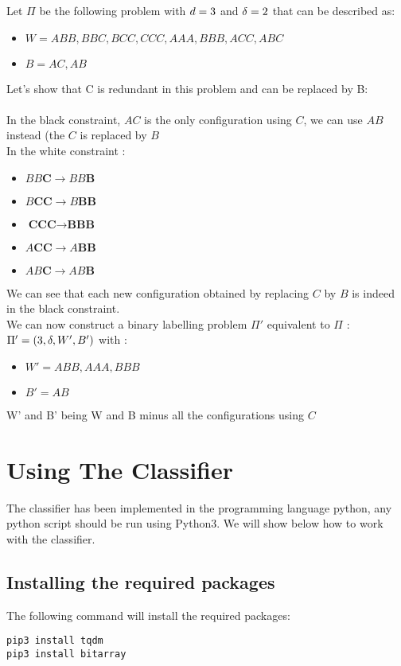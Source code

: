 \begin{exmp}
Let $\Pi$ be the following problem with $d = 3$ and $\delta = 2$ that can be described as:
\begin{itemize}
    \item $W = ABB, BBC, BCC, CCC, AAA, BBB, ACC, ABC$
    \item $B = AC, AB$
\end{itemize}
Let's show that C is redundant in this problem and can be replaced by B:\\\\
In the black constraint, $AC$ is the only configuration using $C$, we can use $AB$ instead (the $C$ is replaced by $B$\\
In the white constraint :
\begin{itemize}
    \item $BB\textbf{C} \rightarrow BB\textbf{B}$
    \item $B\textbf{CC} \rightarrow B\textbf{BB}$
    \item $\textbf{CCC} \rightarrow \textbf{BBB}$
    \item $A\textbf{CC} \rightarrow A\textbf{BB}$
    \item $AB\textbf{C} \rightarrow AB\textbf{B}$
\end{itemize}
We can see that each new configuration obtained by replacing $C$ by $B$ is indeed in the black constraint.\\
We can now construct a binary labelling problem $\Pi'$ equivalent to $\Pi$ :\\
$\Pi'=(3,\delta,W',B')$ with :
\begin{itemize}
    \item $W' = ABB, AAA, BBB$
    \item $B' = AB$
\end{itemize}
W' and B' being W and B minus all the configurations using $C$
\end{exmp}
\section{Using The Classifier}
The classifier has been implemented in the programming language python, any python script should be run using Python3. We will show below how to work with the classifier.
\subsection{Installing the required packages}
The following command will install the required packages:
\begin{lstlisting}
pip3 install tqdm
pip3 install bitarray
\end{lstlisting}
